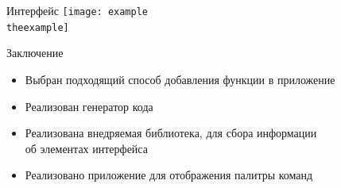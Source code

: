 \documentclass[aspectratio=1610]{beamer}
\newcounter{example}
\begin{document}

%
{
	\begin{frame}{Интерфейс}
		\centering
		\texttt{[image: example\\theexample]}
	\end{frame}
}

\begin{frame}{Заключение}
	\begin{itemize}
		\item Выбран подходящий способ добавления функции в приложение
		\item Реализован генератор кода
		\item Реализована внедряемая библиотека, для сбора информации\\
		об элементах интерфейса
		\item Реализовано приложение для отображения палитры команд
	\end{itemize}
\end{frame}

\begin{frame}[plain]
	\titlepage
\end{frame}
\end{document}
